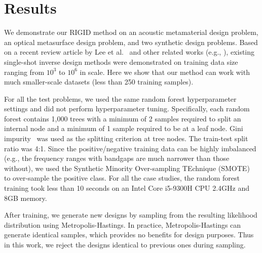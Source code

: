 \documentclass{article}
\begin{document}
\section{Results}
\label{sec:results}

We demonstrate our RIGID method on an acoustic metamaterial design problem, an optical metasurface design problem, and two synthetic design problems. Based on a recent review article by Lee et al.~\cite{lee2023data} and other related works (e.g., \cite{bastek2022inverting}), existing single-shot inverse design methods were demonstrated on training data size ranging from $10^3$ to $10^6$ in scale. Here we show that our method can work with much smaller-scale datasets (less than 250 training samples).

For all the test problems, we used the same random forest hyperparameter settings and did not perform hyperparameter tuning. Specifically, each random forest contains 1,000 trees with a minimum of 2 samples required to split an internal node and a minimum of 1 sample required to be at a leaf node. Gini impurity~\cite{BreiFrieStonOlsh84} was used as the splitting criterion at tree nodes.
The train-test split ratio was 4:1. Since the positive/negative training data can be highly imbalanced (e.g., the frequency ranges with bandgaps are much narrower than those without), we used the Synthetic Minority Over-sampling TEchnique (SMOTE)~\cite{chawla2002smote} to over-sample the positive class. For all the case studies, the random forest training took less than 10 seconds on an Intel Core i5-9300H CPU 2.4GHz and 8GB memory.

After training, we generate new designs by sampling from the resulting likelihood distribution using Metropolis-Hastings. In practice, Metropolis-Hastings can generate identical samples, which provides no benefits for design purposes. Thus in this work, we reject the designs identical to previous ones during sampling.
\end{document}
